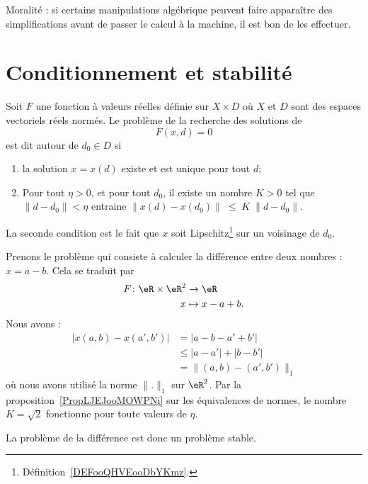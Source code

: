 Moralité : si certains manipulations algébrique peuvent faire apparaître des simplifications avant de passer le calcul à la machine, il est bon de les effectuer.

\section{Conditionnement et stabilité}

\begin{definition}      \label{DEFooYIFAooSJbMkC}
	Soit $F$ une fonction à valeurs réelles définie sur $X\times D$ où $X$ et $D$ sont des espaces vectoriels réels normés. Le problème de la recherche des solutions de
	\begin{equation}
		F(x,d)=0
	\end{equation}
	est dit  autour de \( d_0\in D\) si
	\begin{enumerate}
		\item
			la solution $x=x(d)$ existe et est unique pour tout $d$;
		\item \label{ItemProbStableB}
			Pour tout $\eta>0$, et pour tout $d_0$, il existe un nombre $K>0$ tel que $\| d-d_0\|<\eta$ entraine $\|x(d)-x(d_0)\|\;\leq\;K\;\|d-d_0\|$.
	\end{enumerate}
    La seconde condition est le fait que \( x\) soit Lipschitz\footnote{Définition~\ref{DEFooQHVEooDbYKmz}.} sur un voisinage de \( d_0\).
\end{definition}

\begin{example}    \label{ExooXJONooTAYZVc}
    Prenons le problème qui consiste à calculer la différence entre deux nombres : \( x=a-b\). Cela se traduit par
    \begin{equation}
        \begin{aligned}
            F\colon \eR\times \eR^2&\to \eR \\
            x&\mapsto x-a+b.
        \end{aligned}
    \end{equation}
    Nous avons :
    \begin{subequations}
        \begin{align}
            \big| x(a,b)-x(a',b') \big|&=| a-b-a'+b' |\\
            &\leq| a-a' |+| b-b' |\\
            &=\|  (a,b)-(a',b')  \|_1
        \end{align}
    \end{subequations}
    où nous avons utilisé la norme \( \| . \|_1\) sur \( \eR^2\). Par la proposition~\ref{PropLJEJooMOWPNi} sur les équivalences de normes, le nombre \( K=\sqrt{2}\) fonctionne pour toute valeurs de \( \eta\).

    La problème de la différence est donc un problème stable.
\end{example}

